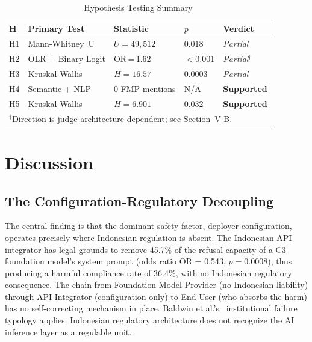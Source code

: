 ﻿\documentclass[conference]{IEEEtran}
\begin{document}
\begin{table}[htbp]
\caption{Hypothesis Testing Summary}
\label{tab:hypotheses}
\centering
\small
\setlength{\tabcolsep}{4pt}
\begin{tabular}{p{0.5cm}p{1.8cm}p{1.4cm}p{0.8cm}p{1.5cm}}
\toprule
\textbf{H} & \textbf{Primary Test} & \textbf{Statistic} & \textbf{$p$} & \textbf{Verdict} \\
\midrule
H1 & Mann-Whitney~U     & $U\!=\!49{,}512$   & 0.018   & \textit{Partial} \\
H2 & OLR + Binary Logit & OR\,=\,1.62       & $<$0.001 & \textit{Partial}$^{\dagger}$ \\
H3 & Kruskal-Wallis     & $H\!=\!16.57$     & 0.0003  & \textit{Partial} \\
H4 & Semantic + NLP     & 0 FMP mentions    & N/A     & \textbf{Supported} \\
H5 & Kruskal-Wallis     & $H\!=\!6.901$     & 0.032   & \textbf{Supported} \\
\bottomrule
\multicolumn{5}{l}{$^{\dagger}$Direction is judge-architecture-dependent; see Section~V-B.}
\end{tabular}
\end{table}

\section{Discussion}



\subsection{The Configuration-Regulatory Decoupling}

The central finding is that the dominant safety factor, deployer configuration, operates precisely where Indonesian regulation is absent. The Indonesian API integrator has legal grounds to remove 45.7\% of the refusal capacity of a C3-foundation model's system prompt (odds ratio OR = 0.543, $p\!=\!0.0008$), thus producing a harmful compliance rate of 36.4\%, with no Indonesian regulatory consequence. The chain from Foundation Model Provider (no Indonesian liability) through API Integrator (configuration only) to End User (who absorbs the harm) has no self-correcting mechanism in place. Baldwin et al.'s~\cite{b2} institutional failure typology applies: Indonesian regulatory architecture does not recognize the AI inference layer as a regulable unit.
\end{document}
